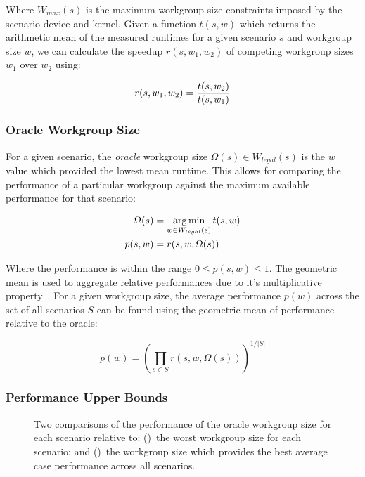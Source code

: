 Where $W_{max}(s)$ is the maximum workgroup size constraints imposed
by the scenario device and kernel. Given a function $t(s,w)$ which
returns the arithmetic mean of the measured runtimes for a given
scenario $s$ and workgroup size $w$, we can calculate the speedup
$r(s, w_1, w_2)$ of competing workgroup sizes $w_1$ over $w_2$ using:

\begin{equation}
  r(s, w_1, w_2) = \frac{t(s,w_2)}{t(s,w_1)}\\
\end{equation}


\subsubsection{Oracle Workgroup Size}

For a given scenario, the \emph{oracle} workgroup size
$\Omega(s) \in W_{legal}(s)$ is the $w$ value which provided the
lowest mean runtime. This allows for comparing the performance of a
particular workgroup against the maximum available performance for
that scenario:

\begin{align}
  \Omega(s) &= \operatorname*{arg\,min}_{w \in W_{legal}(s)} t(s,w)\\
  p(s,w) &= r(s, w, \Omega(s))
\end{align}

Where the performance is within the range $0 \le p(s,w) \le 1$. The
geometric mean is used to aggregate relative performances due to it's
multiplicative property~\cite{Fleming1986}. For a given workgroup
size, the average performance $\bar{p}(w)$ across the set of all
scenarios $S$ can be found using the geometric mean of performance
relative to the oracle:

\begin{equation}
\bar{p}(w) =
\left(
  \prod_{s \in S} r(s, w, \Omega(s))
\right)^{1/|S|}
\end{equation}


\subsubsection{Performance Upper Bounds}

\begin{figure}

\caption{%
  Two comparisons of the performance of the oracle workgroup size for
  each scenario relative to: ()~the
  worst workgroup size for each scenario; and
  ()~the workgroup size which
  provides the best average case performance across all scenarios.%
}
\label{fig:speedups}
\end{figure}

